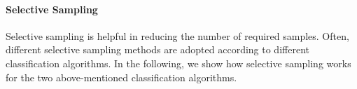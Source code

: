 


\paragraph{Selective Sampling} \label{subsec:active:learning}
Selective sampling is helpful in reducing the number of required samples.
Often, different selective sampling methods are adopted according to different classification algorithms.
In the following, we show how selective sampling works for the two above-mentioned classification algorithms. %

